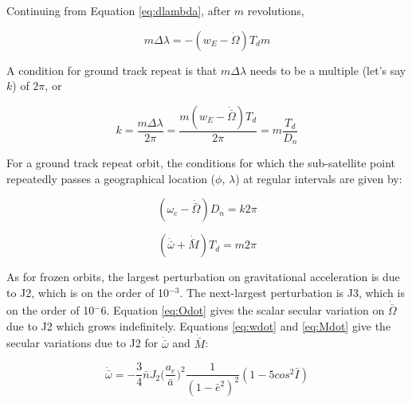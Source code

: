 \documentclass[conf]{new-aiaa}
\begin{document}

Continuing from Equation \ref{eq:dlambda}, after $m$ revolutions, 

\begin{equation}
	m \Delta \lambda = -(w_E - \dot{\Omega}) T_d m 
\end{equation}

A condition for ground track repeat is that $m \Delta \lambda $ needs to be a multiple (let's say $k$) of $2 \pi$, or 

\begin{equation}
	k = \frac{m \Delta \lambda}{2 \pi} = \frac{m ( w_E - \dot{\bar{\Omega}} ) T_d}{ 2 \pi } = m \frac{T_d}{D_n}
\end{equation}

For a ground track repeat orbit, the conditions for which the sub-satellite point repeatedly passes a geographical location ($\phi$, $\lambda$) at regular intervals are given by: 

\begin{equation}
	(\omega_e - \dot{\bar{\Omega}}) D_n = k 2 \pi 
\end{equation}

\begin{equation}
	( \dot{\bar{\omega}} + \dot{\bar{M}} ) T_d = m 2 \pi 
\end{equation}

As for frozen orbits, the largest perturbation on gravitational acceleration is due to J2, which is on the order of 10$^{-3}$. The next-largest perturbation is J3, which is on the order of 10$^-6$. Equation \ref{eq:Odot} gives the scalar secular variation on $\dot{\bar{\Omega}}$ due to J2 which grows indefinitely. Equations \ref{eq:wdot} and \ref{eq:Mdot} give the secular variations due to J2 for $\dot{\bar{\omega}}$ and $\dot{\bar{M}}$: 

\begin{equation}
	\dot{\bar{\omega}} = - \frac{3}{4} \bar{n} J_2 \big( \frac{a_e}{\bar{a}} \big)^2 \frac{1}{( 1 - \bar{e}^2 )^2} (1 - 5 cos^2 \bar{I})
	\label{eq:wdot}
\end{equation}
\end{document}
